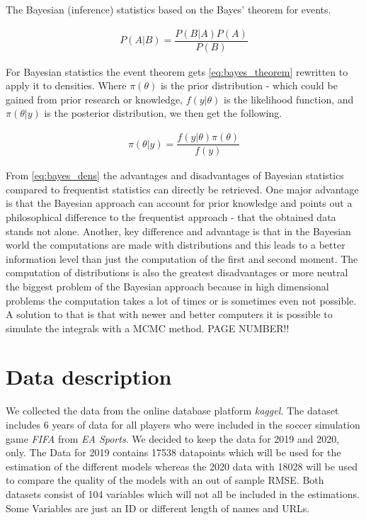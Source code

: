 \documentclass[12pt,a4paper]{article}
\begin{document}
The Bayesian (inference) statistics based on the Bayes' theorem for
events.

\begin{align}
\label{eq:bayes_theorem}
  P(A | B) = \dfrac{P (B | A) P(A)}{P(B)}
\end{align}

For Bayesian statistics the event theorem gets \eqref{eq:bayes_theorem}
rewritten to apply it to densities. Where \(\pi (\theta)\) is the prior
distribution - which could be gained from prior research or knowledge,
\(f(y | \theta )\) is the likelihood function, and \(\pi (\theta| y)\)
is the posterior distribution, we then get the following.

\begin{align}
\label{eq:bayes_dens}
  \pi (\theta | y) = \dfrac{f(y | \theta) \pi(\theta)}{f(y)}
\end{align}

From \eqref{eq:bayes_dens} the advantages and disadvantages of Bayesian
statistics compared to frequentist statistics can directly be retrieved.
One major advantage is that the Bayesian approach can account for prior
knowledge and points out a philosophical difference to the frequentist
approach - that the obtained data stands not alone. Another, key
difference and advantage is that in the Bayesian world the computations
are made with distributions and this leads to a better information level
than just the computation of the first and second moment. The
computation of distributions is also the greatest disadvantages or more
neutral the biggest problem of the Bayesian approach because in high
dimensional problems the computation takes a lot of times or is
sometimes even not possible. A solution to that is that with newer and
better computers it is possible to simulate the integrals with a
\ac{MCMC} method. \autocite[p.~100]{ghosh_introduction_2006} PAGE
NUMBER!! \newpage

\hypertarget{data-description}{%
\section{Data description}\label{data-description}}

We collected the data from the online database platform \emph{kaggel.}
The dataset includes 6 years of data for all players who were included
in the soccer simulation game \emph{FIFA} from \emph{EA Sports}. We
decided to keep the data for 2019 and 2020, only. The Data for 2019
contains 17538 datapoints which will be used for the estimation of the
different models whereas the 2020 data with 18028 will be used to
compare the quality of the models with an out of sample \ac{RMSE}. Both
datasets consist of 104 variables which will not all be included in the
estimations. Some Variables are just an ID or different length of names
and URLs. \autocite{leone_fifa_2020}
\end{document}
